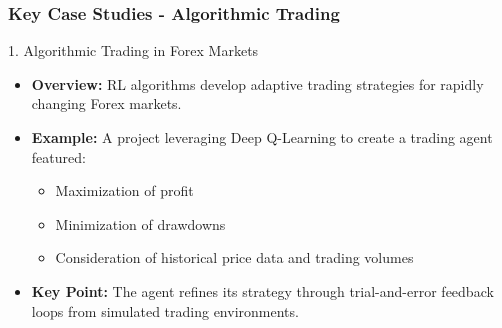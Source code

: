 \documentclass[aspectratio=169]{beamer}
\begin{document}
\begin{frame}[fragile]
    \frametitle{Key Case Studies - Algorithmic Trading}
    \begin{block}{1. Algorithmic Trading in Forex Markets}
        \begin{itemize}
            \item \textbf{Overview:} RL algorithms develop adaptive trading strategies for rapidly changing Forex markets.
            \item \textbf{Example:} A project leveraging Deep Q-Learning to create a trading agent featured:
            \begin{itemize}
                \item Maximization of profit
                \item Minimization of drawdowns
                \item Consideration of historical price data and trading volumes
            \end{itemize}
            \item \textbf{Key Point:} The agent refines its strategy through trial-and-error feedback loops from simulated trading environments.
        \end{itemize}
    \end{block}
\end{frame}
\end{document}
